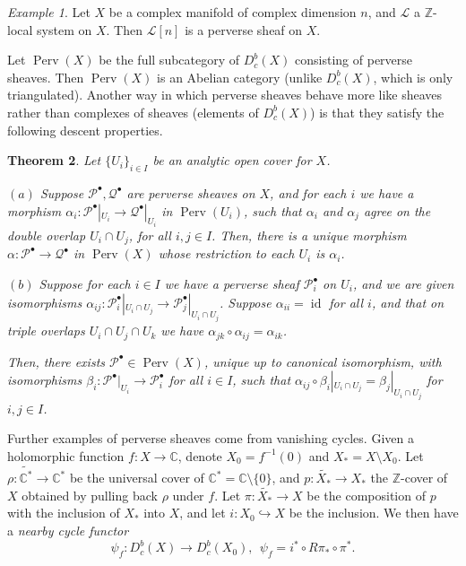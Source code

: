 \documentclass [11pt]{amsart}
\newtheorem {theorem}{Theorem}[section]
\theoremstyle{remark}
\newtheorem {example}[theorem]{Example}
\def\zz {{\mathbb{Z}}}
\def\cc {{\mathbb{C}}}
\def\C{\cc}
\def\Z {\zz}
\def\Perv {\operatorname{Perv}}
\def\L{\mathcal{L}}
\def\Pb {\mathcal{P}^\bullet}
\def\Qb{\mathcal{Q}^\bullet}
\def\id{\operatorname{id}}
\begin{document}
\begin{example}
Let $X$ be a complex manifold of complex dimension $n$, and $\L$ a $\Z$-local system on $X$. Then $\L[n]$ is a perverse sheaf on $X$.
\end{example}

Let $\Perv(X)$ be the full subcategory of $D^b_c(X)$ consisting of perverse sheaves. Then $\Perv(X)$ is an Abelian category (unlike  $D^b_c(X)$, which is only triangulated). Another way in which perverse sheaves behave more like sheaves rather than complexes of sheaves (elements of $D^b_c(X)$) is that they satisfy the following descent properties.

\begin{theorem}
\label{thm:descent}
Let $\{U_i\}_{i \in I}$ be an analytic open cover for $X$. 

$(a)$ Suppose $\Pb, \Qb$ are perverse sheaves on $X$, and for each $i$ we have a morphism $\alpha_i : \Pb|_{U_i} \to \Qb|_{U_i}$ in $\Perv(U_i)$, such that $\alpha_i$ and $\alpha_j$ agree on the double overlap $U_i \cap U_j$, for all $i, j \in I$. Then, there is a unique morphism $\alpha: \Pb \to \Qb$ in $\Perv(X)$ whose restriction to each $U_i$ is $\alpha_i$.

$(b)$ Suppose for each $i \in I$ we have a perverse sheaf $\Pb_i$ on $U_i$, and we are given isomorphisms $\alpha_{ij}: \Pb_i|_{U_i \cap U_j} \to \Pb_j|_{U_i \cap U_j}$. Suppose $\alpha_{ii} = \id$ for all $i$, and that on triple overlaps $U_i \cap U_j \cap U_k$ we have $\alpha_{jk} \circ \alpha_{ij}= \alpha_{ik}$. 

Then, there exists $\Pb \in \Perv(X)$, unique up to canonical isomorphism, with isomorphisms $\beta_i : \Pb|_{U_i} \to \Pb_i$ for all $i \in I$, such that $\alpha_{ij} \circ \beta_i|_{U_i \cap U_j} = \beta_j|_{U_i \cap U_j}$ for $i, j\in I$.
\end{theorem}

Further examples of perverse sheaves come from vanishing cycles. Given a holomorphic function $f: X \to \C$, denote $X_0 = f^{-1}(0)$ and $X_* = X \setminus X_0$. Let $\rho: \widetilde{\C^*} \to \C^*$ be the universal cover of $\C^* = \C \setminus \{0\}$, and $p: \widetilde{X_*} \to X_*$ the $\Z$-cover of $X$ obtained by pulling back $\rho$ under $f$. Let $\pi:  \widetilde{X_*} \to X$ be the composition of $p$ with the inclusion of $X_*$ into $X$, and let $i: X_0 \hookrightarrow X$ be the inclusion. We then have a {\em nearby cycle functor}
$$ \psi_f: D^b_c(X) \to D^b_c(X_0), \ \ \psi_f = i^* \circ R\pi_* \circ \pi^*.$$
\end{document}
